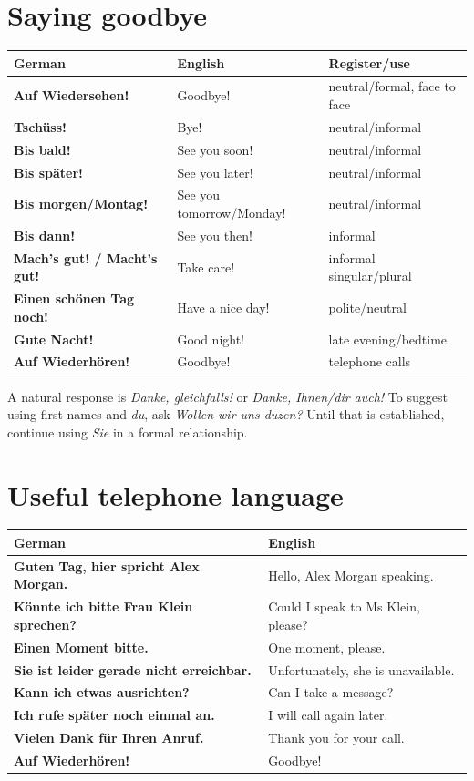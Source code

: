 \section{Saying goodbye}

\begin{center}
\small
{}
\begin{tabularx}{\textwidth}{@{}>{\bfseries}l l X@{}}
\toprule
German & English & Register/use \\
\midrule
Auf Wiedersehen! & Goodbye! & neutral/formal, face to face \\
Tschüss! & Bye! & neutral/informal \\
Bis bald! & See you soon! & neutral/informal \\
Bis später! & See you later! & neutral/informal \\
Bis morgen/Montag! & See you tomorrow/Monday! & neutral/informal \\
Bis dann! & See you then! & informal \\
Mach's gut! / Macht's gut! & Take care! & informal singular/plural \\
Einen schönen Tag noch! & Have a nice day! & polite/neutral \\
Gute Nacht! & Good night! & late evening/bedtime \\
Auf Wiederhören! & Goodbye! & telephone calls \\
\bottomrule
\end{tabularx}
\end{center}

A natural response is \textit{Danke, gleichfalls!} or
\textit{Danke, Ihnen/dir auch!} To suggest using first names and
\textit{du}, ask \textit{Wollen wir uns duzen?} Until that is established,
continue using \textit{Sie} in a formal relationship.

\section{Useful telephone language}

\begin{center}
\small
{}
\begin{tabularx}{\textwidth}{@{}>{\bfseries}X X@{}}
\toprule
German & English \\
\midrule
Guten Tag, hier spricht Alex Morgan. & Hello, Alex Morgan speaking. \\
Könnte ich bitte Frau Klein sprechen? & Could I speak to Ms Klein, please? \\
Einen Moment bitte. & One moment, please. \\
Sie ist leider gerade nicht erreichbar. & Unfortunately, she is unavailable. \\
Kann ich etwas ausrichten? & Can I take a message? \\
Ich rufe später noch einmal an. & I will call again later. \\
Vielen Dank für Ihren Anruf. & Thank you for your call. \\
Auf Wiederhören! & Goodbye! \\
\bottomrule
\end{tabularx}
\end{center}

